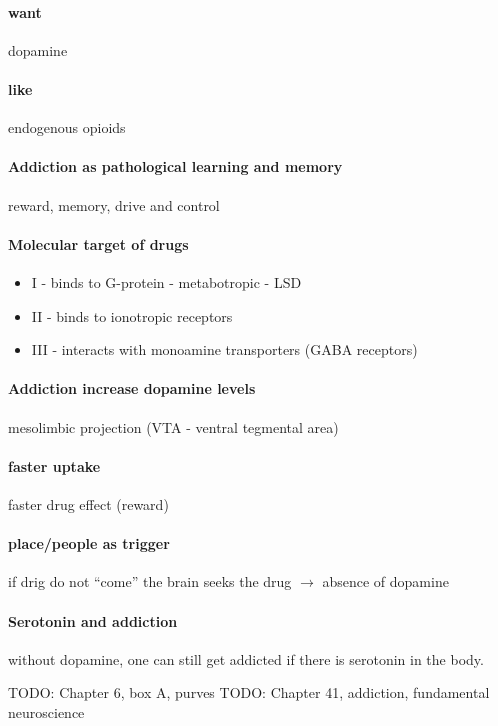 \documentclass[12pt,article,oneside,a4paper]{memoir}
\begin{document}
\paragraph{want} dopamine
\paragraph{like} endogenous opioids

\paragraph{Addiction as pathological learning and memory} reward, memory, drive and control

\paragraph{Molecular target of drugs}
\begin{itemize}
\item I - binds to G-protein - metabotropic - LSD
\item II - binds to ionotropic receptors
\item III - interacts with monoamine transporters (GABA receptors)
\end{itemize}

\paragraph{Addiction increase dopamine levels} mesolimbic projection (VTA - ventral tegmental area)

\paragraph{faster uptake} faster drug effect (reward)
\paragraph{place/people as trigger} if drig do not ``come'' the brain seeks the drug $\rightarrow$ absence of dopamine

\paragraph{Serotonin and addiction} without dopamine, one can still get addicted if there is serotonin in the body.

TODO: Chapter 6, box A, purves
TODO: Chapter 41, addiction, fundamental neuroscience
\end{document}

